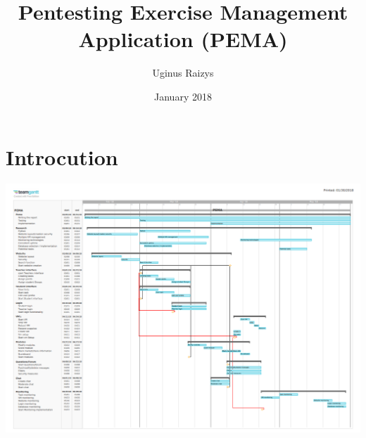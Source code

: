 \documentclass{article}
\title{Pentesting Exercise Management Application (PEMA)}
\author{Uginus Raizys }
\date{January 2018}
\begin{document}
\maketitle

\tableofcontents

\section{Introcution}

\includegraphics[scale=0.3]{Pema-gant}
\end{document}
